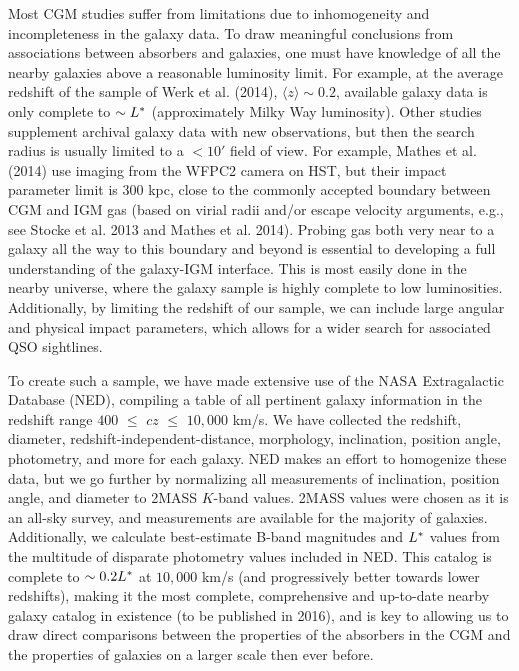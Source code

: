 \documentclass[12pt]{article}
\begin{document}
\indent Most CGM studies suffer from limitations due to inhomogeneity and incompleteness in the galaxy data. To draw meaningful conclusions from associations between absorbers and galaxies, one must have knowledge of all the nearby galaxies above a reasonable luminosity limit. For example, at the average redshift of the sample of Werk et al. (2014), $\langle z \rangle \sim 0.2$, available galaxy data is only complete to $\sim L^{\**}$ (approximately Milky Way luminosity). Other studies supplement archival galaxy data with new observations, but then the search radius is usually limited to a $<10'$ field of view. For example, Mathes et al. (2014) use imaging from the WFPC2 camera on HST, but their impact parameter limit is 300 kpc, close to the commonly accepted boundary between CGM and IGM gas (based on virial radii and/or escape velocity arguments, e.g., see Stocke et al. 2013 and Mathes et al. 2014). Probing gas both very near to a galaxy all the way to this boundary and beyond is essential to developing a full understanding of the galaxy-IGM interface. This is most easily done in the nearby universe, where the galaxy sample is highly complete to low luminosities. Additionally, by limiting the redshift of our sample, we can include large angular and physical impact parameters, which allows for a wider search for associated QSO sightlines.


To create such a sample, we have made extensive use of the NASA Extragalactic Database (NED), compiling a table of all pertinent galaxy information in the redshift range $400$ $\leq$ $cz$ $\leq$ $10,000$ km/s. We have collected the redshift, diameter, redshift-independent-distance, morphology, inclination, position angle, photometry, and more for each galaxy. NED makes an effort to homogenize these data, but we go further by normalizing all measurements of inclination, position angle, and diameter to 2MASS $K$-band values. 2MASS values were chosen as it is an all-sky survey, and measurements are available for the majority of galaxies. Additionally, we calculate best-estimate B-band magnitudes and $L^{\**}$ values from the multitude of disparate photometry values included in NED. This catalog is complete to $\sim0.2 L^{\**}$ at $10,000$ km/s (and progressively better towards lower redshifts), making it the most complete, comprehensive and up-to-date nearby galaxy catalog in existence (to be published in 2016), and is key to allowing us to draw direct comparisons between the properties of the absorbers in the CGM and the properties of galaxies on a larger scale then ever before.\\
\end{document}
